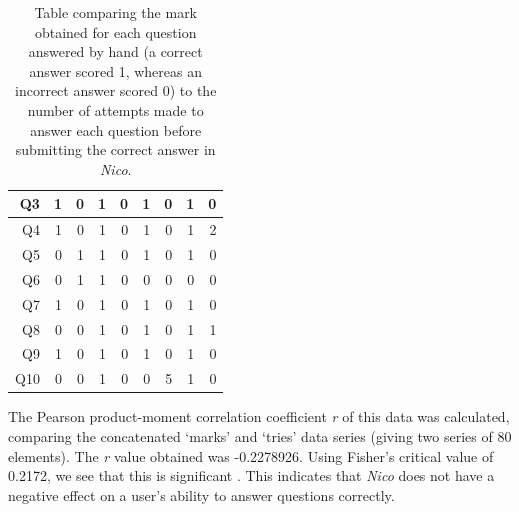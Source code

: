 \documentclass[12pt,twoside,notitlepage,xetex]{report}
\begin{document}
\begin{center}
\begin{table}[H]
\begin{center}
\begin{tabular}{|r||r|r||r|r||r|r||r|r|}
Q3 & 1 & 0 & 1 & 0 & 1 & 0 & 1 & 0\\ \hline
Q4 & 1 & 0 & 1 & 0 & 1 & 0 & 1 & 2\\ \hline
Q5 & 0 & 1 & 1 & 0 & 1 & 0 & 1 & 0\\ \hline
Q6 & 0 & 1 & 1 & 0 & 0 & 0 & 0 & 0\\ \hline
Q7 & 1 & 0 & 1 & 0 & 1 & 0 & 1 & 0\\ \hline
Q8 & 0 & 0 & 1 & 0 & 1 & 0 & 1 & 1\\ \hline
Q9 & 1 & 0 & 1 & 0 & 1 & 0 & 1 & 0\\ \hline
Q10 & 0 & 0 & 1 & 0 & 0 & 5 & 1 & 0\\
\hline
\end{tabular}
\end{center}
\caption{Table comparing the mark obtained for each question answered by hand (a correct answer scored 1, whereas an incorrect answer scored 0) to the number of attempts made to answer each question before submitting the correct answer in \emph{Nico}.}
\label{tab:MarksTries}
\end{table}
\end{center}

The Pearson product-moment correlation coefficient \emph{r} of this data was calculated, comparing the concatenated `marks' and `tries' data series (giving two series of 80 elements).  The \emph{r} value obtained was -0.2278926.  Using Fisher's critical value of 0.2172, we see that this is significant \cite{Fisher1990}.  This indicates that \emph{Nico} does not have a negative effect on a user's ability to answer questions correctly.
\end{document}
